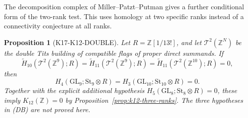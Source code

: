 \documentclass[11pt,a4paper]{article}
\newtheorem{proposition}[theorem]{Proposition}
\theoremstyle{definition}
\begin{document}
The decomposition complex of Miller--Patzt--Putman gives a further
conditional form of the two-rank test. This uses homology at two
specific ranks instead of a connectivity conjecture at all ranks.

\begin{proposition}[K17-K12-DOUBLE]\label{prop:k12-double-building}
Let $R=\mathbb Z[1/13!]$, and let $\mathcal T^2(\mathbb Z^N)$
be the double Tits building of compatible flags of proper direct
summands. If
\[
 \widetilde H_{10}(\mathcal T^2(\mathbb Z^9);R)=
 \widetilde H_{11}(\mathcal T^2(\mathbb Z^9);R)=
 \widetilde H_{11}(\mathcal T^2(\mathbb Z^{10});R)=0,
                                                               \tag{DB}
\]
then
\[
 H_4(\mathrm{GL}_9;\mathrm{St}_9\otimes R)=
 H_3(\mathrm{GL}_{10};\mathrm{St}_{10}\otimes R)=0.
\]
Together with the explicit additional hypothesis
$H_5(\mathrm{GL}_8;\mathrm{St}_8\otimes R)=0$, these imply
$K_{12}(\mathbb Z)=0$ by Proposition~\ref{prop:k12-three-ranks}.
The three hypotheses in \textup{(DB)} are not proved here.
\end{proposition}
\end{document}
